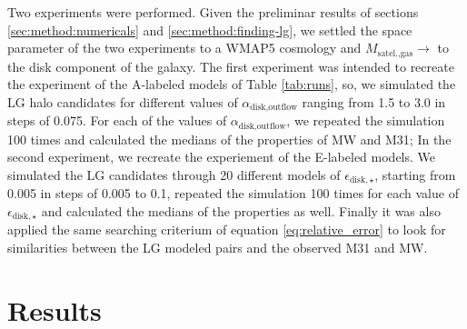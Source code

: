 \documentclass[usenatbib]{mn2e}
\begin{document}
Two experiments were performed. Given the preliminar results of sections \ref{sec:method:numericals} and \ref{sec:method:finding-lg}, 
we settled the space parameter of the two experiments to a WMAP5 cosmology and $M_{\text{satel.,gas}}\to$ to the disk component of the galaxy.
The first experiment was intended to recreate the experiment of the A-labeled models of Table \ref{tab:runs}, so, we simulated the LG halo candidates for different
values of $\alpha_{\text{disk,outflow}}$ ranging from 1.5  to 3.0 in steps of 0.075. For each of the values of $\alpha_{\text{disk,outflow}}$, we repeated
the simulation 100 times and calculated the medians of the properties of MW and M31; 
In the second experiment, we recreate the experiement of the E-labeled models.  We simulated the LG candidates through 20 different models of 
$\epsilon_{\text{disk},\star}$, starting from 0.005 in steps of 0.005 to 0.1, repeated the simulation 100 times for each value of 
$\epsilon_{\text{disk},\star}$ and calculated the medians of the properties as well. Finally  it was also applied the same searching criterium of equation
\ref{eq:relative_error} to look for similarities between the LG modeled pairs and the observed M31 and MW.
\section{Results}
\end{document}
